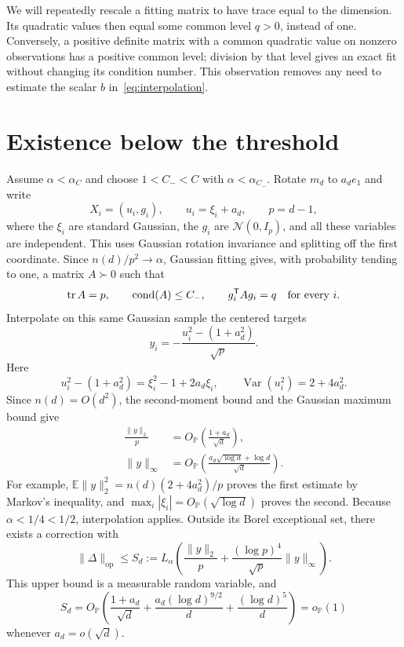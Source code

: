 \documentclass[11pt]{article}
\newcommand{\Pbb}{\mathbb P}
\newcommand{\E}{\mathbb E}
\DeclareMathOperator{\tr}{tr}
\DeclareMathOperator{\cond}{cond}
\DeclareMathOperator{\Var}{Var}
\newcommand{\opnorm}[1]{\lVert#1\rVert_{\mathrm{op}}}
\newcommand{\norm}[1]{\lVert#1\rVert}
\newcommand{\OP}{O_{\Pbb}}
\newcommand{\oP}{o_{\Pbb}}
\theoremstyle{remark}
\begin{document}
We will repeatedly rescale a fitting matrix to have trace equal to the
dimension. Its quadratic values then equal some common level $q>0$,
instead of one. Conversely, a positive definite matrix with a common
quadratic value on nonzero observations has a positive common level;
division by that level gives an exact fit without changing its condition
number. This observation removes any need to estimate the scalar $b$
in~\eqref{eq:interpolation}.

\section{Existence below the threshold}
\label{sec:conditioned-existence}

Assume $\alpha<\alpha_C$ and choose $1<C_-<C$ with
$\alpha<\alpha_{C_-}$. Rotate $m_d$ to $a_de_1$ and write
\[
 X_i=(u_i,g_i),\qquad u_i=\xi_i+a_d,
 \qquad p=d-1,
\]
where the $\xi_i$ are standard Gaussian, the $g_i$ are
$\mathcal N(0,I_p)$, and all these variables are independent. This
uses Gaussian rotation invariance and splitting off the first
coordinate. Since $n(d)/p^2\to\alpha$, Gaussian fitting
gives, with probability tending to one, a matrix $A\succ0$ such that
\[
 \tr A=p,\qquad \cond(A)\le C_-,\qquad
 g_i^{\mathsf T}Ag_i=q\quad\hbox{for every }i.
\]
Interpolate on this same Gaussian sample the centered targets
\begin{equation}\label{eq:sat-targets}
 y_i=-\frac{u_i^2-(1+a_d^2)}{\sqrt p}.
\end{equation}
Here
\[
 u_i^2-(1+a_d^2)=\xi_i^2-1+2a_d\xi_i,
 \qquad \Var(u_i^2)=2+4a_d^2.
\]
Since $n(d)=O(d^2)$, the second-moment bound and the Gaussian maximum
bound give
\begin{align}
 \frac{\norm y_2}{p}
    &=\OP\left(\frac{1+a_d}{\sqrt d}\right),\label{eq:sat-l2}\\
 \norm y_\infty
    &=\OP\left(\frac{a_d\sqrt{\log d}+\log d}{\sqrt d}\right).
       \label{eq:sat-linf}
\end{align}
For example, $\E\norm y_2^2=n(d)(2+4a_d^2)/p$ proves the first
estimate by Markov's inequality, and
$\max_i|\xi_i|=\OP(\sqrt{\log d})$ proves the second.
Because $\alpha<1/4<1/2$, interpolation applies. Outside its Borel
exceptional set, there exists a correction with
\[
 \opnorm\Delta\le S_d:=L_\alpha\left(
   \frac{\norm y_2}{p}+\frac{(\log p)^4}{\sqrt p}\norm y_\infty\right).
\]
This upper bound is a measurable random variable, and
\begin{equation}\label{eq:sat-correction}
 S_d=\OP\left(
  \frac{1+a_d}{\sqrt d}
  +\frac{a_d(\log d)^{9/2}}{d}
  +\frac{(\log d)^5}{d}\right)=\oP(1)
\end{equation}
whenever $a_d=o(\sqrt d)$.
\end{document}
